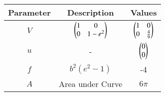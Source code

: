 \begin{tabular}[12pt]{|c|c|c|}
    \hline
    Parameter & Description & Values\\ 
    \hline
    $V$ & $\begin{pmatrix} 1 & 0 \\ 0 & 1-e^{2} \end{pmatrix}$ & $\begin{pmatrix}1 & 0 \\ 0 & \frac{4}{9} \end{pmatrix}$ \\
    \hline
    $u$ & - & $\begin{pmatrix}0 \\ 0\end{pmatrix}$ \\
    \hline
    $f$ & $b^2(e^2 -1)$ & -4 \\
    \hline
    $A$ & Area under Curve & $6\pi$ \\
    \hline
    \end{tabular}
